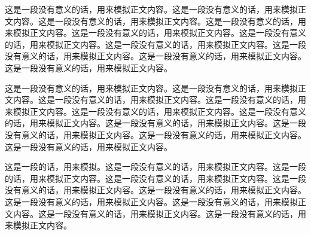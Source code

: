
这是一段没有意义的话，用来模拟正文内容。这是一段没有意义的话，用来模拟正文内容。这是一段没有意义的话，用来模拟正文内容。这是一段没有意义的话，用来模拟正文内容。这是一段没有意义的话，用来模拟正文内容。这是一段没有意义的话，用来模拟正文内容。这是一段没有意义的话，用来模拟正文内容。这是一段没有意义的话，用来模拟正文内容。这是一段没有意义的话，用来模拟正文内容。这是一段没有意义的话，用来模拟正文内容。




这是一段没有意义的话，用来模拟正文内容。这是一段没有意义的话，用来模拟正文内容。这是一段没有意义的话，用来模拟正文内容。这是一段没有意义的话，用来模拟正文内容。这是一段没有意义的话，用来模拟正文内容。这是一段没有意义的话，用来模拟正文内容。这是一段没有意义的话，用来模拟正文内容。这是一段没有意义的话，用来模拟正文内容。这是一段没有意义的话，用来模拟正文内容。这是一段没有意义的话，用来模拟正文内容。



这是一段的话，用来模拟。这是一段没有意义的话，用来模拟正文内容。这是一段的话，用来模拟正文内容。这是一段没有意义的话，用来模拟正文内容。这是一段没有意义的话，用来模拟正文内容。这是一段没有意义的话，用来模拟正文内容。这是一段没有意义的话，用来模拟正文内容。这是一段没有意义的话，用来模拟正文内容。这是一段没有意义的话，用来模拟正文内容。这是一段没有意义的话，用来模拟正文内容。

